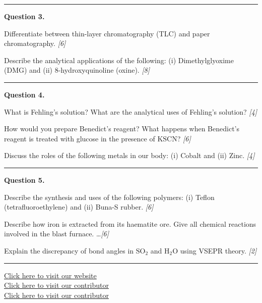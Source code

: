 \documentclass[11pt,a4paper]{article}
\newcommand{\pts}[1]{\hfill   \textit{[#1]}}
\begin{document}
\medskip\rule{\linewidth}{0.2pt}




\noindent   \textbf{Question 3.}

\begin{parts}
  \item Differentiate between thin-layer chromatography (TLC) and paper chromatography. \pts{6}
  \item Describe the analytical applications of the following: (i) Dimethylglyoxime (DMG) and (ii) 8-hydroxyquinoline (oxine). \pts{8}
\end{parts}

\medskip\rule{\linewidth}{0.2pt}




\noindent   \textbf{Question 4.}

\begin{parts}
  \item What is Fehling's solution? What are the analytical uses of Fehling's solution? \pts{4}
  \item How would you prepare Benedict's reagent? What happens when Benedict's reagent is treated with glucose in the presence of $ \text{KSCN}$? \pts{6}
  \item Discuss the roles of the following metals in our body: (i) Cobalt and (ii) Zinc. \pts{4}
\end{parts}

\medskip\rule{\linewidth}{0.2pt}




\noindent   \textbf{Question 5.}

\begin{parts}
  \item Describe the synthesis and uses of the following polymers: (i) Teflon (tetrafluoroethylene) and (ii) Buna-S rubber. \pts{6}
  \item Describe how iron is extracted from its haematite ore. Give all chemical reactions involved in the blast furnace. \dots \pts{6}
  \item Explain the discrepancy of bond angles in $ \text{SO}_2$ and $ \text{H}_2 \text{O}$ using VSEPR theory. \pts{2}
\end{parts}

\vfill
\rule{\linewidth}{0.4pt}

\begin{center}\small
  \href{https://bhu-exam.vercel.app/}{Click here to visit our website}\\[4pt]
  \href{https://me-aryan.vercel.app/}{Click here to visit our contributor}\\[4pt]
  \href{https://quashan-me.vercel.app/}{Click here to visit our contributor}
\end{center}
\end{document}
